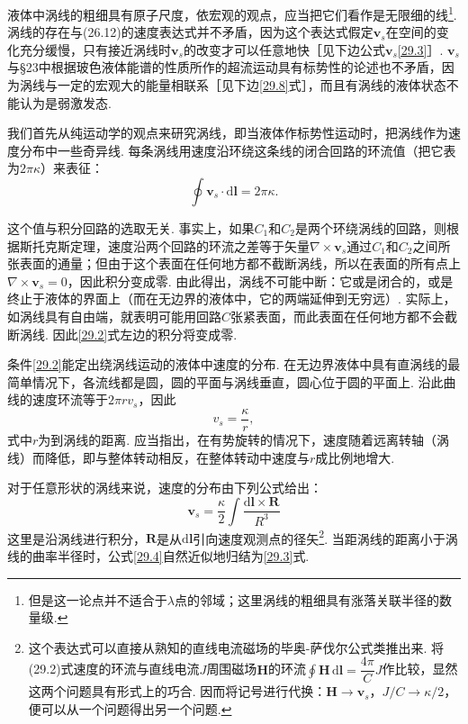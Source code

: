 液体中涡线的粗细具有原子尺度，依宏观的观点，应当把它们看作是无限细的线\footnote{但是这一论点并不适合于$\lambda$点的邻域；这里涡线的粗细具有涨落关联半径的数量级.}. 涡线的存在与(26.12)的速度表达式并不矛盾，因为这个表达式假定$\bm{v}_{s}$在空间的变化充分缓慢，只有接近涡线时$\bm{v}_{s}$的改变才可以任意地快［见下边公式$\bm{v}_{s}$\eqref{29.3}］. $\bm{v}_{s}$与§23中根据玻色液体能谱的性质所作的超流运动具有标势性的论述也不矛盾，因为涡线与一定的宏观大的能量相联系［见下边\eqref{29.8}式］，而且有涡线的液体状态不能认为是弱激发态.

我们首先从纯运动学的观点来研究涡线，即当液体作标势性运动时，把涡线作为速度分布中一些奇异线. 每条涡线用速度沿环绕这条线的闭合回路的环流值（把它表为$2\pi\kappa$）来表征：
\begin{equation}
\oint\bm{v}_{s}\cdot\mathrm{d}\bm{l}=2\pi\kappa.
\label{29.2}
\end{equation}

这个值与积分回路的选取无关. 事实上，如果$C_{1}$和$C_{2}$是两个环绕涡线的回路，则根据斯托克斯定理，速度沿两个回路的环流之差等于矢量$\nabla\times\bm{v}_{s}$通过$C_{1}$和$C_{2}$之间所张表面的通量；但由于这个表面在任何地方都不截断涡线，所以在表面的所有点上$\nabla\times\bm{v}_{s}=0$，因此积分变成零. 由此得出，涡线不可能中断：它或是闭合的，或是终止于液体的界面上（而在无边界的液体中，它的两端延伸到无穷远）. 实际上，如涡线具有自由端，就表明可能用回路$C$张紧表面，而此表面在任何地方都不会截断涡线. 因此\eqref{29.2}式左边的积分将变成零.

条件\eqref{29.2}能定出绕涡线运动的液体中速度的分布. 在无边界液体中具有直涡线的最简单情况下，各流线都是圆，圆的平面与涡线垂直，圆心位于圆的平面上. 沿此曲线的速度环流等于$2\pi rv_{s}$，因此
\begin{equation}
v_{s}=\frac{\kappa}{r},
\label{29.3}
\end{equation}
式中$r$为到涡线的距离. 应当指出，在有势旋转的情况下，速度随着远离转轴（涡线）而降低，即与整体转动相反，在整体转动中速度与$r$成比例地增大.

对于任意形状的涡线来说，速度的分布由下列公式给出：
\begin{equation}
\bm{v}_{s}=\frac{\kappa}{2}\int\frac{\mathrm{d}\bm{l}\times\bm{R}}{R^{3}}
\label{29.4}
\end{equation}
这里是沿涡线进行积分，$\bm{R}$是从$\mathrm{d}\bm{l}$引向速度观测点的径矢\footnote{这个表达式可以直接从熟知的直线电流磁场的毕奥-萨伐尔公式类推出来. 将(29.2)式速度的环流与直线电流$J$周围磁场$\bm{H}$的环流$\oint\bm{H}\,\mathrm{d}\bm{l}=\dfrac{4\pi}{C}J$作比较，显然这两个问题具有形式上的巧合. 因而将记号进行代换：$\bm{H}\to\bm{v}_{s}$，$J/C\to\kappa/2$，便可以从一个问题得出另一个问题.}. 当距涡线的距离小于涡线的曲率半径时，公式\eqref{29.4}自然近似地归结为\eqref{29.3}式.

